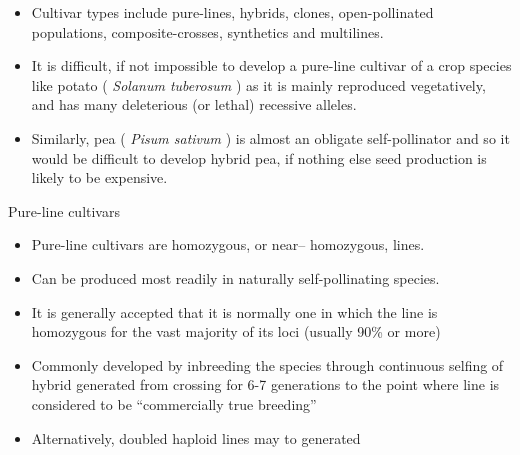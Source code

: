 \documentclass[11pt,ignorenonframetext,aspectratio=169]{beamer}
\providecommand{\tightlist}{%
  \setlength{\itemsep}{0pt}\setlength{\parskip}{0pt}}
\begin{document}
\begin{frame}{}
\protect\hypertarget{section-21}{}
\begin{itemize}
\tightlist
\item
  Cultivar types include pure-lines, hybrids, clones, open-pollinated
  populations, composite-crosses, synthetics and multilines.
\item
  It is difficult, if not impossible to develop a pure-line cultivar of
  a crop species like potato ( \emph{Solanum tuberosum} ) as it is
  mainly reproduced vegetatively, and has many deleterious (or lethal)
  recessive alleles.
\item
  Similarly, pea ( \emph{Pisum sativum} ) is almost an obligate
  self-pollinator and so it would be difficult to develop hybrid pea, if
  nothing else seed production is likely to be expensive.
\end{itemize}
\end{frame}

\begin{frame}{Pure-line cultivars}
\protect\hypertarget{pure-line-cultivars}{}
\begin{itemize}
\tightlist
\item
  Pure-line cultivars are homozygous, or near-- homozygous, lines.
\item
  Can be produced most readily in naturally self-pollinating species.
\item
  It is generally accepted that it is normally one in which the line is
  homozygous for the vast majority of its loci (usually 90\% or more)
\item
  Commonly developed by inbreeding the species through continuous
  selfing of hybrid generated from crossing for 6-7 generations to the
  point where line is considered to be ``commercially true breeding''
\item
  Alternatively, doubled haploid lines may to generated
\end{itemize}
\end{frame}
\end{document}
